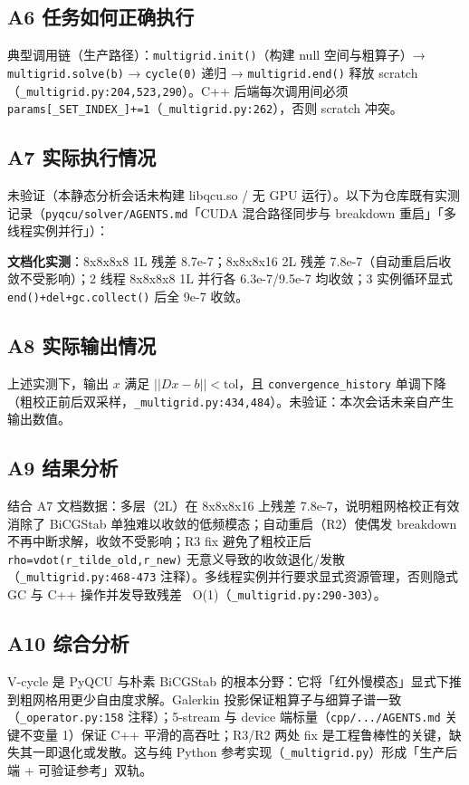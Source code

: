 \documentclass[UTF8]{ctexart}
\begin{document}
\subsection{A6 任务如何正确执行}
典型调用链（生产路径）：\texttt{multigrid.init()}（构建 null 空间与粗算子）→ \texttt{multigrid.solve(b)} → \texttt{cycle(0)} 递归 → \texttt{multigrid.end()} 释放 scratch（\nolinkurl{_multigrid.py:204,523,290}）。C++ 后端每次调用间必须 \nolinkurl{params[_SET_INDEX_]+=1}（\nolinkurl{_multigrid.py:262}），否则 scratch 冲突。

\subsection{A7 实际执行情况}
\textcolor{warn}{未验证（本静态分析会话未构建 libqcu.so / 无 GPU 运行）}。以下为仓库既有实测记录（\texttt{pyqcu/solver/AGENTS.md}「CUDA 混合路径同步与 breakdown 重启」「多线程实例并行」）：
\begin{keybox}
\textbf{文档化实测}：8x8x8x8 1L 残差 8.7e-7；8x8x8x16 2L 残差 7.8e-7（自动重启后收敛不受影响）；2 线程 8x8x8x8 1L 并行各 6.3e-7/9.5e-7 均收敛；3 实例循环显式 \texttt{end()+del+gc.collect()} 后全 9e-7 收敛。
\end{keybox}

\subsection{A8 实际输出情况}
上述实测下，输出 $x$ 满足 $||Dx-b||<\text{tol}$，且 \texttt{convergence\_history} 单调下降（粗校正前后双采样，\texttt{\_multigrid.py:434,484}）。\textcolor{warn}{未验证}：本次会话未亲自产生输出数值。

\subsection{A9 结果分析}
结合 A7 文档数据：多层（2L）在 8x8x8x16 上残差 7.8e-7，说明粗网格校正有效消除了 BiCGStab 单独难以收敛的低频模态；自动重启（R2）使偶发 breakdown 不再中断求解，收敛不受影响；R3 fix 避免了粗校正后 \texttt{rho=vdot(r\_tilde\_old,r\_new)} 无意义导致的收敛退化/发散（\texttt{\_multigrid.py:468-473} 注释）。多线程实例并行要求显式资源管理，否则隐式 GC 与 C++ 操作并发导致残差 ~O(1)（\texttt{\_multigrid.py:290-303}）。

\subsection{A10 综合分析}
V-cycle 是 PyQCU 与朴素 BiCGStab 的根本分野：它将「红外慢模态」显式下推到粗网格用更少自由度求解。Galerkin 投影保证粗算子与细算子谱一致（\texttt{\_operator.py:158} 注释）；5-stream 与 device 端标量（\texttt{cpp/.../AGENTS.md} 关键不变量 1）保证 C++ 平滑的高吞吐；R3/R2 两处 fix 是工程鲁棒性的关键，缺失其一即退化或发散。这与纯 Python 参考实现（\texttt{\_multigrid.py}）形成「生产后端 + 可验证参考」双轨。
\end{document}
